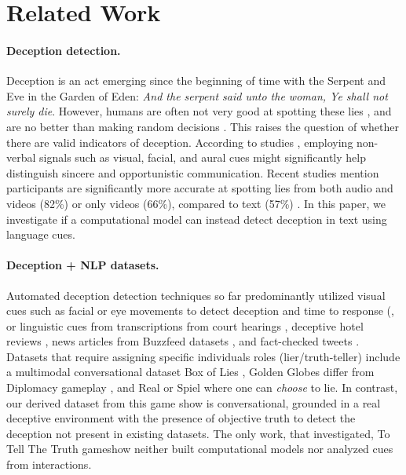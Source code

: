 \section{Related Work}

\paragraph{Deception detection.} Deception is an act emerging since the beginning of time with the Serpent and Eve in the Garden of Eden: \emph{And the serpent said unto the woman, Ye shall not surely die}. However, humans are often not very good at spotting these lies \cite{belot2012can,gneezy2005deception}, and are no better than making random decisions \cite{ockenfels2000experiment}. This raises the question of whether there are valid indicators of deception. According to studies \cite{wang2010pinocchio,depaulo2003cues,ekman1997deception,zuckerman1981verbal, wang2010pinocchio}, employing non-verbal signals such as visual, facial, and aural cues might significantly help distinguish sincere and opportunistic communication. 
Recent studies mention participants are significantly more accurate at spotting lies from both audio and videos (82\%) or only videos (66\%), compared to text (57\%) \cite{wittenberg2021minimal,groh2022human}. In this paper, we investigate if a computational model can instead detect deception in text using language cues.


\paragraph{Deception + NLP datasets.} Automated deception detection techniques so far predominantly utilized visual cues such as facial or eye movements to detect deception and time to response (\cite{meservy2005deception,gonzalez2019can}, or linguistic cues from transcriptions from court hearings \cite{fornaciari2013automatic}, deceptive hotel reviews \cite{ott2013negative}, news articles from Buzzfeed datasets \cite{potthast2017stylometric}, and fact-checked tweets \cite{van2022personal}. Datasets that require assigning specific individuals roles (lier/truth-teller) include a multimodal conversational dataset Box of Lies \cite{soldner2019box}, Golden Globes \cite{darai2013attraction} differ from Diplomacy gameplay \cite{peskov2020takes}, and Real or Spiel \cite{ho2016computer} where one can \emph{choose} to lie. In contrast, our derived dataset from this game show is conversational, grounded in a real deceptive environment with the presence of objective truth to detect the deception not present in existing datasets. The only work, \cite{banerjee2023experience} that investigated, To Tell The Truth gameshow neither built computational models nor analyzed cues from interactions. 

